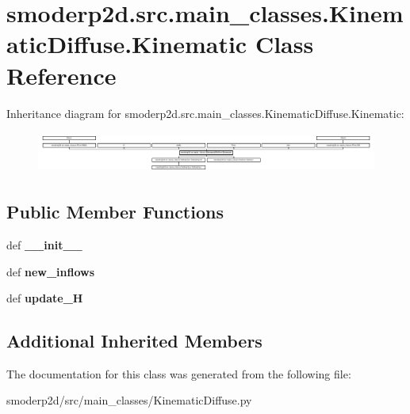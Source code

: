 \hypertarget{classsmoderp2d_1_1src_1_1main__classes_1_1KinematicDiffuse_1_1Kinematic}{\section{smoderp2d.\-src.\-main\-\_\-classes.\-Kinematic\-Diffuse.\-Kinematic Class Reference}
\label{classsmoderp2d_1_1src_1_1main__classes_1_1KinematicDiffuse_1_1Kinematic}
}
Inheritance diagram for smoderp2d.\-src.\-main\-\_\-classes.\-Kinematic\-Diffuse.\-Kinematic\-:\begin{figure}[H]
\begin{center}
\leavevmode
\includegraphics[height=1.376598cm]{classsmoderp2d_1_1src_1_1main__classes_1_1KinematicDiffuse_1_1Kinematic}
\end{center}
\end{figure}
\subsection*{Public Member Functions}
\begin{DoxyCompactItemize}
\item 
\hypertarget{classsmoderp2d_1_1src_1_1main__classes_1_1KinematicDiffuse_1_1Kinematic_adc69a0521f7fd79c536c029d5a1d92aa}{def {\bfseries \-\_\-\-\_\-init\-\_\-\-\_\-}}\label{classsmoderp2d_1_1src_1_1main__classes_1_1KinematicDiffuse_1_1Kinematic_adc69a0521f7fd79c536c029d5a1d92aa}

\item 
\hypertarget{classsmoderp2d_1_1src_1_1main__classes_1_1KinematicDiffuse_1_1Kinematic_a1f9263e8cccf589dc954a3223730befe}{def {\bfseries new\-\_\-inflows}}\label{classsmoderp2d_1_1src_1_1main__classes_1_1KinematicDiffuse_1_1Kinematic_a1f9263e8cccf589dc954a3223730befe}

\item 
\hypertarget{classsmoderp2d_1_1src_1_1main__classes_1_1KinematicDiffuse_1_1Kinematic_aa64ce31fcbf34b0cfce9905dc7c8d8fb}{def {\bfseries update\-\_\-\-H}}\label{classsmoderp2d_1_1src_1_1main__classes_1_1KinematicDiffuse_1_1Kinematic_aa64ce31fcbf34b0cfce9905dc7c8d8fb}

\end{DoxyCompactItemize}
\subsection*{Additional Inherited Members}


The documentation for this class was generated from the following file\-:\begin{DoxyCompactItemize}
\item 
smoderp2d/src/main\-\_\-classes/Kinematic\-Diffuse.\-py\end{DoxyCompactItemize}
